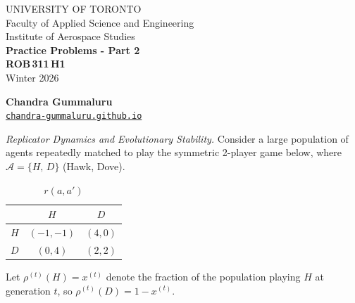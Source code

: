 \documentclass[12pt]{article}
\begin{document}
\begin{center}\large
  UNIVERSITY OF TORONTO\\
  Faculty of Applied Science and Engineering\\[1.75ex]
  Institute of Aerospace Studies\\[1.75ex]
  \textbf{Practice Problems - Part 2} \\
  \textbf{ROB\,311\,H1} \\[4mm]
  Winter 2026

  \vspace{3cm}
  \textbf{Chandra Gummaluru} \\
  \href{https://chandra-gummaluru.github.io}{\texttt{chandra-gummaluru.github.io}}
\end{center}

\clearpage

\item \textit{Replicator Dynamics and Evolutionary Stability.}
Consider a large population of agents repeatedly matched to play the symmetric 2-player game below, where $\mathcal{A} = \{H,\,D\}$ (Hawk, Dove).
\begin{table}[H]
  \centering
  \begin{tabular}{|c|c|c|}
    \hline
           & $H$         & $D$    \\\hline
    $H$    & $(-1,-1)$        & $(4,0)$    \\\hline
    $D$    & $(0,4)$         & $(2,2)$    \\\hline
  \end{tabular}
  \caption*{$r(a,a')$}
\end{table}
\noindent Let $\rho^{(t)}(H) = x^{(t)}$ denote the fraction of the population playing $H$ at generation $t$, so $\rho^{(t)}(D) = 1 - x^{(t)}$.
\end{document}
